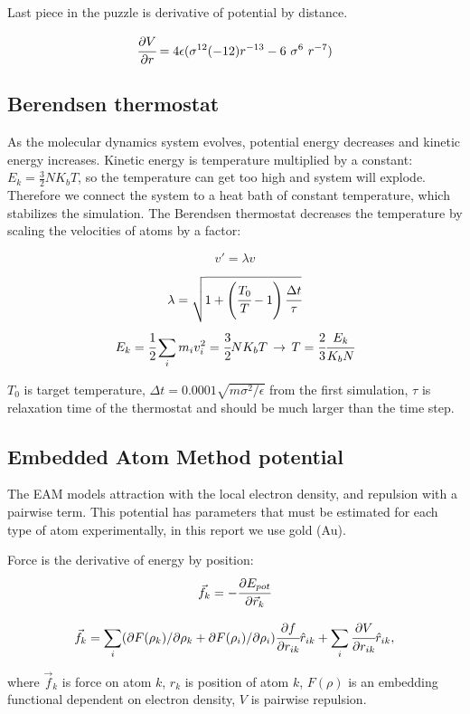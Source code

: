 \documentclass[12pt,a4paper]{article}
\newcommand{\infers}{\,\to\,}
\newcommand{\mat}[1]{\vec{#1}}
\begin{document}
Last piece in the puzzle is derivative of potential by distance.

\[
\cfrac{\partial V}{\partial r} = 4\epsilon (\sigma^{12} (-12) r^{-13} - 6 \  \sigma^6 \ r^{-7})
\]

\subsection*{Berendsen thermostat}

As the molecular dynamics system evolves, potential energy decreases and kinetic energy increases. Kinetic energy is temperature multiplied by a constant: $E_k = \frac{3}{2} NK_b T$, so the temperature can get too high and system will explode. Therefore we connect the system to a heat bath of constant temperature, which stabilizes the simulation. The Berendsen thermostat \cite{berendsen} decreases the temperature by scaling the velocities of atoms by a factor:

\[ v' = \lambda v \]

\[ \lambda = \sqrt{1 + \left(\cfrac{T_0}{T}-1 \right) \cfrac{\Delta t}{\tau} }  \]
\[ E_k = \cfrac{1}{2} \sum_i m_i v_i^2 = \cfrac{3}{2} N K_b T \infers T = \cfrac{2}{3} \cfrac{E_k}{K_b N} \]

\(T_0\) is target temperature, \(\Delta t = 0.0001 \sqrt{m\sigma^2 / \epsilon} \) from the first simulation, \( \tau \) is relaxation time of the thermostat and should be much larger than the time step.

\subsection*{Embedded Atom Method potential}

The EAM models attraction with the local electron density, and repulsion with a pairwise term. This potential has parameters that must be estimated for each type of atom experimentally, in this report we use gold (Au).

Force is the derivative of energy by position:
\[
\mat{f}_k = -\cfrac{\partial E_{pot}}{\partial \mat{r}_k}
\]

\[
\mat{f}_k = \sum_i ( \partial F(\rho_k) / \partial \rho_k + \partial F(\rho_i) / \partial \rho_i )  \cfrac{\partial f}{\partial r_{ik}} \hat{r}_{ik} +
\sum_i \cfrac{\partial V}{\partial r_{ik}} \hat{r}_{ik},
\]

where $\mat{f}_k$ is force on atom $k$, $r_k$ is position of atom $k$, $F(\rho)$ is an embedding functional dependent on electron density, $V$ is pairwise repulsion.
\end{document}
